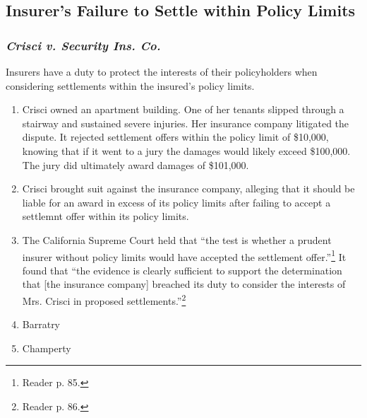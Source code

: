\subsection{Insurer's Failure to Settle within Policy Limits}

\subsubsection{\emph{Crisci v. Security Ins. Co.}}

Insurers have a duty to protect the interests of their policyholders when 
considering settlements within the insured's policy limits.

\begin{enumerate}
    \item Crisci owned an apartment building. One of her tenants slipped 
    through a stairway and sustained severe injuries. Her insurance company 
    litigated the dispute. It rejected settlement offers within the policy 
    limit of \$10,000, knowing that if it went to a jury the damages would 
    likely exceed \$100,000. The jury did ultimately award damages of 
    \$101,000.
    \item Crisci brought suit against the insurance company, alleging that it 
    should be liable for an award in excess of its policy limits after failing 
    to accept a settlemnt offer within its policy limits.\
    \item The California Supreme Court held that ``the test is whether a 
    prudent insurer without policy limits would have accepted the settlement 
    offer.''\footnote{Reader p. 85.} It found that ``the evidence is 
    clearly sufficient to support the determination that [the insurance 
    company] breached its duty to consider the interests of Mrs. Crisci in 
    proposed settlements.''\footnote{Reader p. 86.}

    \item Barratry
    \item Champerty
\end{enumerate}
